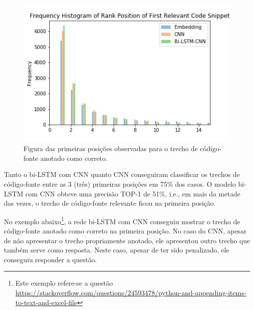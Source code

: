 \begin{figure}[h]
    \centering
    \includegraphics[width=1\textwidth]{figuras/cap-resultados-preliminares/histogram_results.png}
    \caption{Figura das primeiras posições observadas para o trecho de código-fonte anotado como correto.}
    \label{fig:histogram-mrr}
\end{figure}


Tanto o bi-LSTM com CNN quanto CNN conseguiram classificar os trechos de código-fonte entre as 3 (três) primeiras posições em 75\% dos casos. O modelo bi-LSTM com CNN obteve uma precisão TOP-1 de 51\%, i.e., em mais da metade das vezes, o trecho de código-fonte relevante ficou na primeira posição. 

No exemplo abaixo\footnote{Este exemplo refere-se a questão \url{https://stackoverflow.com/questions/24593478/python-and-appending-items-to-text-and-excel-file}\label{foot:exemplo-resultados-preliminares}}, a rede bi-LSTM com CNN conseguiu mostrar o trecho de código-fonte anotado como correto na primeira posição.
No caso do CNN, apesar de não apresentar o trecho propriamente anotado, ele apresentou outro trecho que também serve como resposta. Neste caso, apesar de ter sido penalizado, ele conseguiu responder a questão. 

